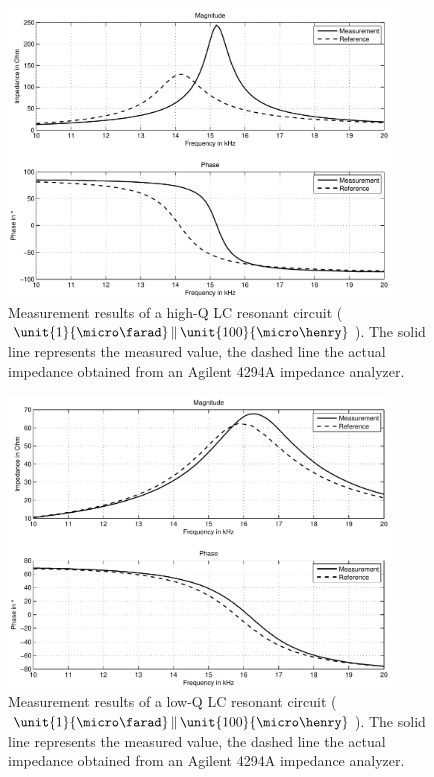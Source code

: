 \begin{figure}[htpb]
  \centering
    \includegraphics[width=0.9\textwidth]{bilder/meas_S22.pdf}
  \caption{Measurement results of a high-Q LC resonant circuit ($ \unit{1}{\micro\farad} \,\|\, \unit{100}{\micro\henry} $).
    The solid line represents the measured value, the dashed line the actual impedance obtained from an Agilent 4294A
    impedance analyzer. }
  \label{fig:meas_S22}
\end{figure}

\begin{figure}[htpb]
  \centering
    \includegraphics[width=0.9\textwidth]{bilder/meas_LCP.pdf}
  \caption{Measurement results of a low-Q LC resonant circuit ($ \unit{1}{\micro\farad} \,\|\, \unit{100}{\micro\henry} $).
    The solid line represents the measured value, the dashed line the actual impedance obtained from an Agilent 4294A
    impedance analyzer. }
  \label{fig:meas_LCP}
\end{figure}

